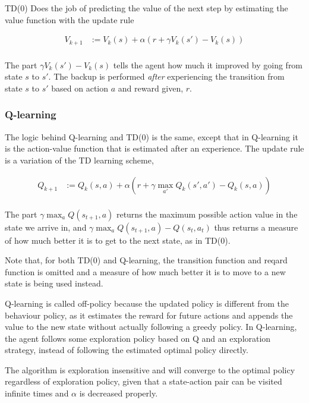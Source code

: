TD(0) Does the job of predicting the value of the next step by estimating the value function with the update rule

\begin{align}
    V_{k+1} &:= V_k(s) + \alpha(r + \gamma V_k(s') - V_k(s)) \\
    \label{eq:td0}
\end{align}


The part $\gamma V_k(s') - V_k(s)$ tells the agent how much it improved by going from state $s$ to $s'$. The backup is performed \textit{after} experiencing the transition from state $s$ to $s'$ based on action $a$ and reward given, $r$.


\subsubsection{Q-learning}

The logic behind Q-learning and TD(0) is the same, except that in Q-learning it is the action-value function that is estimated after an experience. The update rule is a variation of the TD learning scheme,

\begin{align}
    Q_{k+1} &:= Q_k(s, a) + \alpha(r + \gamma \max_{a'} Q_k(s', a') - Q_k(s, a)) \\
    \label{eq:qlearn}
\end{align}

The part $\gamma \max_a Q(s_{t+1}, a)$ returns the maximum possible action value in the state we arrive in, and 
$\gamma \max_a Q(s_{t+1}, a) - Q(s_{t}, a_t)$ thus returns a measure of how much better it is to get to the next state, as in TD(0).

Note that, for both TD(0) and Q-learning, the transition function and reqard function is omitted and a measure of how much better it is to move to a new state is being used instead.

Q-learning is called off-policy because the updated policy is different from the behaviour policy, as it estimates the reward for future actions and appends the value to the new state without actually following a greedy policy. In Q-learning, the agent follows some exploration policy based on Q and an exploration strategy, instead of following the estimated optimal policy directly.

The algorithm is exploration insensitive and will converge to the optimal policy regardless of exploration policy, given that a state-action pair can be visited infinite times and $\alpha$ is decreased properly.

